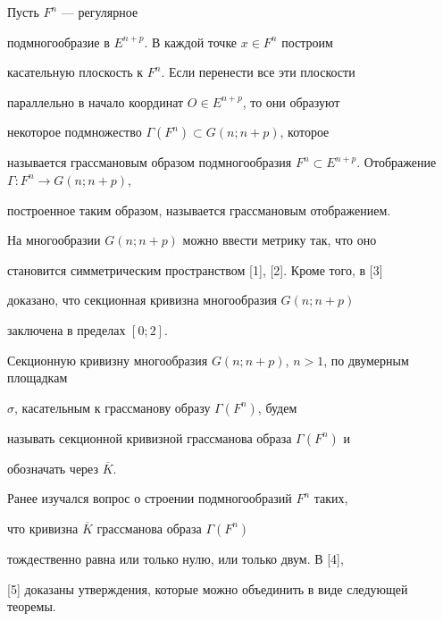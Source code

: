 \begin{defn}


Пусть $F^{n}$ --- регулярное


подмногообразие в $E^{n+p}$. В каждой точке $x \in F^{n}$ построим


касательную плоскость к $F^{n}$. Если перенести все эти плоскости


параллельно в начало координат $O \in E^{n+p}$, то они образуют


некоторое подмножество $\Gamma(F^{n}) \subset G(n;n+p)$, которое


называется грассмановым образом подмногообразия $F^{n}\subset


E^{n+p}$. Отображение $\Gamma: F^{n}\longrightarrow G(n;n+p)$,


построенное таким образом, называется грассмановым отображением.


\end{defn}





На многообразии $G(n;n+p)$ можно ввести метрику так, что оно


становится симметрическим пространством [1], [2]. Кроме того, в [3]


доказано, что секционная кривизна многообразия $G(n;n+p)$


заключена в пределах $[0;2]$.





Секционную кривизну многообразия $G(n;n+p)$, $n>1$, по двумерным площадкам


$\sigma $, касательным к грассманову образу $\Gamma(F^{n})$, будем


называть секционной кривизной грассманова образа $\Gamma(F^{n})$ и


обозначать через $\overline K$.





Ранее изучался вопрос о строении подмногообразий $F^{n}$ таких,


что кривизна $\overline K$ грассманова образа $\Gamma(F^{n})$


тождественно равна или только нулю, или только двум. В [4],


[5] доказаны утверждения, которые можно объединить в виде следующей теоремы.





